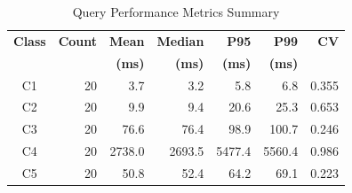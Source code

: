 
\begin{table}[htbp]
\centering
\caption{Query Performance Metrics Summary}
\label{tab:performance_summary}
\begin{tabular}{|c|r|r|r|r|r|r|}
\hline
\textbf{Class} & \textbf{Count} & \textbf{Mean} & \textbf{Median} & \textbf{P95} & \textbf{P99} & \textbf{CV} \\
& & \textbf{(ms)} & \textbf{(ms)} & \textbf{(ms)} & \textbf{(ms)} & \\
\hline
C1 & 20 & 3.7 & 3.2 & 5.8 & 6.8 & 0.355 \\
C2 & 20 & 9.9 & 9.4 & 20.6 & 25.3 & 0.653 \\
C3 & 20 & 76.6 & 76.4 & 98.9 & 100.7 & 0.246 \\
C4 & 20 & 2738.0 & 2693.5 & 5477.4 & 5560.4 & 0.986 \\
C5 & 20 & 50.8 & 52.4 & 64.2 & 69.1 & 0.223 \\

\hline
\end{tabular}
\end{table}
